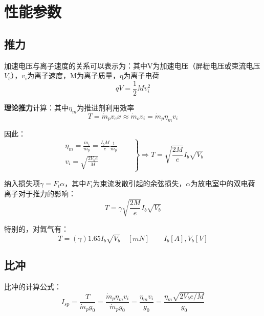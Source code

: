 \section{性能参数}
  \subsection{推力}
    加速电压与离子速度的关系可以表示为：其中V为加速电压（屏栅电压或束流电压$V_b$），$v_i$为离子速度，M为离子质量，q为离子电荷
    \begin{equation}
      q V = \frac{1}{2} M v_i^2
    \end{equation}

    \textbf{理论推力}计算：其中$\eta_m$为推进剂利用效率
    \begin{equation}
      T = \dot{m}_p v_ex \approx \dot{m}_o v_i = \dot{m}_p \eta_m v_i
    \end{equation}  

    因此：
    \begin{equation}
      \left.\begin{aligned}
        \eta_m = \frac{\dot{m}_i}{\dot{m}_p} = \frac{I_b M}{e} \frac{1}{\dot{m}_p} & \\
        v_i = \sqrt{\frac{2V_b e }{M}} &
      \end{aligned} \quad \right\} \Rightarrow T = \sqrt{\frac{2M}{e}} I_b \sqrt{V_b}
    \end{equation}

    纳入损失项$\gamma = F_t \alpha$，其中$F_t$为束流发散引起的余弦损失，$\alpha$为放电室中的双电荷离子对于推力的影响：
    \begin{equation}
      T = \gamma \sqrt{\frac{2M}{e}} I_b \sqrt{V_b}
    \end{equation}

    特别的，对氙气有：
    \begin{equation}
      T = (\gamma) 1.65 I_b \sqrt{V_b} \quad [mN] \quad \quad I_b[A], V_b[V]
    \end{equation}
  
  \subsection{比冲}
    比冲的计算公式：
    \begin{equation}
      I_{sp} = \frac{T}{\dot{m}_p g_0} = \frac{\dot{m}_p \eta_m v_i}{\dot{m}_p g_0} = \frac{\eta_m v_i}{g_0} = \frac{\eta_m \sqrt{2V_b e / M}}{g_0}
    \end{equation}

